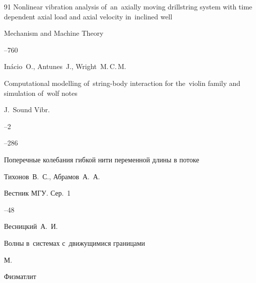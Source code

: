 \begin{thebibliography}{91}
\paper Nonlinear vibration analysis of~an~axially moving drillstring system with time dependent axial load and axial velocity in~inclined well

\jour Mechanism and Machine Theory




--760





\by In\'acio~O., Antunes~J., Wright~M.\,C.\,M.

\paper Computational modelling of~string-body interaction for the~violin family and simulation of~wolf notes

\jour J.~Sound Vibr.


--2


--286







\paper Поперечные колебания гибкой нити переменной длины в потоке 

\by Тихонов~В.~С., Абрамов~А.~А.

\jour Вестник МГУ. Сер.~1



--48











\by Весницкий~А.~И.

\book Волны в~системах с~движущимися границами

\publaddr М.

\publ Физматлит


\end{thebibliography}
